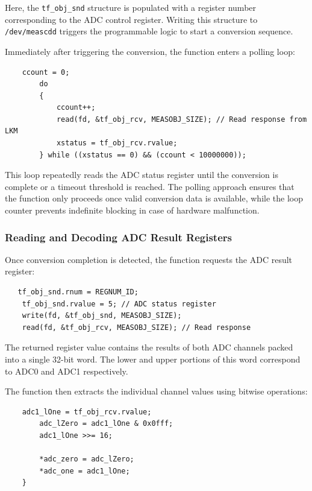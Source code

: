 Here, the \texttt{tf\_obj\_snd} structure is populated with a register number corresponding to the ADC control register. Writing this structure to \texttt{/dev/meascdd} triggers the programmable logic to start a conversion sequence.

Immediately after triggering the conversion, the function enters a polling loop:

\begin{verbatim}
    ccount = 0;
        do
        {
            ccount++;
            read(fd, &tf_obj_rcv, MEASOBJ_SIZE); // Read response from LKM
            xstatus = tf_obj_rcv.rvalue;
        } while ((xstatus == 0) && (ccount < 10000000));
\end{verbatim}

This loop repeatedly reads the ADC status register until the conversion is complete or a timeout threshold is reached. The polling approach ensures that the function only proceeds once valid conversion data is available, while the loop counter prevents indefinite blocking in case of hardware malfunction.

\subsubsection{Reading and Decoding ADC Result Registers}
Once conversion completion is detected, the function requests the ADC result register:

\begin{verbatim}
   tf_obj_snd.rnum = REGNUM_ID;
    tf_obj_snd.rvalue = 5; // ADC status register
    write(fd, &tf_obj_snd, MEASOBJ_SIZE);
    read(fd, &tf_obj_rcv, MEASOBJ_SIZE); // Read response
\end{verbatim}

The returned register value contains the results of both ADC channels packed into a single 32-bit word. The lower and upper portions of this word correspond to ADC0 and ADC1 respectively.

The function then extracts the individual channel values using bitwise operations:


\begin{verbatim}
    adc1_lOne = tf_obj_rcv.rvalue;
        adc_lZero = adc1_lOne & 0x0fff;
        adc1_lOne >>= 16;

        *adc_zero = adc_lZero;
        *adc_one = adc1_lOne;
    }
\end{verbatim}


